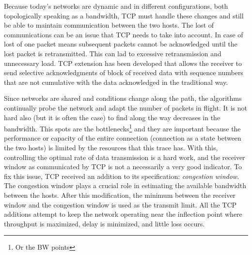 Because today's networks are dynamic and in different configurations, both
topologically speaking as a  bandwidth, TCP must handle these changes and
still be able to maintain communication between the two hosts. The lost of
communications can be an issue that TCP needs to take into account. In case of
lost of one packet means subsequent packets cannot be acknowledged until the
lost packet is retransmitted. This can lad to excessive retransmission and
unnecessary load. TCP extension has been developed that allows the receiver to
send selective acknowledgments of block of received data with sequence numbers
that are not cumulative with the data acknowledged in the traditional
way\cite{RFC2018}.

Since networks are shared and conditions change along the path, the algorithms
continually probe the network and adapt the number of packets in flight. It is
not hard also (but it is often the case) to find along the way decreases in
the bandwidth. This spots are the bottlenecks\footnote{Or the \gls{BW}
points} and they are important because the performance or capacity of the
entire connection (connection as a state between the two hosts) is limited by
the resources that this trace has. With this, controlling the optimal rate of
data transmission is a hard work, and the receiver window as communicated by
TCP is not a necessarily a very good indicator. To fix this issue, TCP
received an addition to its specification: \textit{congestion window}. The
congestion window plays a crucial role in estimating the available bandwidth
between the hosts. After this modification, the minimum between the receiver
window and the congestion window is used as the transmit limit. All the TCP
additions attempt to keep the network operating near the inflection point
where throughput is maximized, delay is minimized, and little loss occurs.

